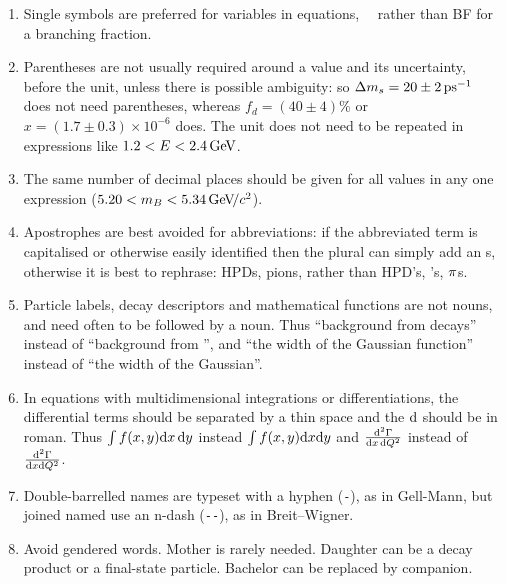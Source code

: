 \begin{enumerate}
\item Single symbols are preferred for variables in equations, \eg\
  \BF\ rather than BF for a branching fraction.

\item Parentheses are not usually required around a value and its
  uncertainty, before the unit, unless there is possible ambiguity: so
  \mbox{${\Delta m_{{s}}} = 20 \pm 2\text{\,ps}^{-1}$} does not need parentheses,
  whereas \mbox{$f_d = (40 \pm 4)$\%} or \mbox{$x=(1.7\pm0.3)\times 10^{-6}$} does.
  The unit does not need to be repeated in
  expressions like \mbox{$1.2 < E < 2.4\text{\,Ge\kern -0.1em V}$}.

\item The same number of decimal places should be given for all values
  in any one expression (\eg \mbox{$5.20 < m_B < 5.34\text{\,Ge\kern -0.1em V\!/}c^2$}).

\item Apostrophes are best avoided for abbreviations: if the abbreviated term
  is capitalised or otherwise easily identified then the plural can simply add
  an s, otherwise it is best to rephrase: \eg HPDs, pions, rather
  than HPD's, \piz's, ${\pi}$s.

\item Particle labels, decay descriptors and mathematical functions are not nouns, and need often to be followed by a noun. 
Thus ``background from \decay{\Bd}{\pip\pim} decays'' instead of ``background from \decay{\Bd}{\pip\pim}'',
and ``the width of the Gaussian function'' instead of ``the width of the Gaussian''.

\item In equations with multidimensional integrations or differentiations, the differential terms should be separated by a thin space and the $\rm d$ should be in roman.
Thus $\int f(x,y) {\rm d}x\,{\rm d}y$ instead $\int f(x,y) {\rm d}x{\rm d}y$ and
$\frac{{\rm d}^2\Gamma}{{\rm d}x\,{\rm d}Q^2}$ instead of $\frac{{\rm d}^2\Gamma}{{\rm d}x{\rm d}Q^2}$.

\item Double-barrelled names are typeset with a hyphen (\verb!-!), as in Gell-Mann, but joined named use an n-dash (\verb!--!), as in Breit--Wigner. 

\item Avoid gendered words. Mother is rarely needed. Daughter can be a decay product or a final-state particle. Bachelor can be replaced by companion.
\end{enumerate}

